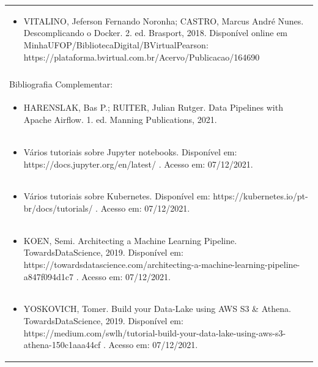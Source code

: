 \documentclass[11pt]{article}
\begin{document}
\begin{center}
\begin{longtable}{|p{4cm}|p{4cm}|p{4cm}|p{4cm}|}
\multicolumn{4}{|p{\dimexpr 16cm + 6\tabcolsep\relax}|}{\begin{itemize}\item VITALINO, Jeferson Fernando Noronha; CASTRO, Marcus André Nunes. Descomplicando o Docker. 2. ed. Brasport, 2018. Disponível online em MinhaUFOP/BibliotecaDigital/BVirtualPearson: https://plataforma.bvirtual.com.br/Acervo/Publicacao/164690\end{itemize}}\\
\multicolumn{4}{|p{16cm}|}{}\\
\hline
\multicolumn{4}{|p{16cm}|}{Bibliografia Complementar:}\\*
\multicolumn{4}{|p{\dimexpr 16cm + 6\tabcolsep\relax}|}{\begin{itemize}\item HARENSLAK, Bas P.; RUITER, Julian Rutger. Data Pipelines with Apache Airflow. 1. ed. Manning Publications, 2021.\end{itemize}}\\
\multicolumn{4}{|p{\dimexpr 16cm + 6\tabcolsep\relax}|}{\begin{itemize}\item Vários tutoriais sobre Jupyter notebooks. Disponível em: https://docs.jupyter.org/en/latest/ . Acesso em: 07/12/2021.\end{itemize}}\\
\multicolumn{4}{|p{\dimexpr 16cm + 6\tabcolsep\relax}|}{\begin{itemize}\item Vários tutoriais sobre Kubernetes. Disponível em: https://kubernetes.io/pt-br/docs/tutorials/ . Acesso em: 07/12/2021.\end{itemize}}\\
\multicolumn{4}{|p{\dimexpr 16cm + 6\tabcolsep\relax}|}{\begin{itemize}\item KOEN, Semi. Architecting a Machine Learning Pipeline. TowardsDataScience, 2019. Disponível em: https://towardsdatascience.com/architecting-a-machine-learning-pipeline-a847f094d1c7 . Acesso em: 07/12/2021.\end{itemize}}\\
\multicolumn{4}{|p{\dimexpr 16cm + 6\tabcolsep\relax}|}{\begin{itemize}\item YOSKOVICH, Tomer. Build your Data-Lake using AWS S3 \& Athena. TowardsDataScience, 2019. Disponível em: https://medium.com/swlh/tutorial-build-your-data-lake-using-aws-s3-athena-150c1aaa44cf . Acesso em: 07/12/2021.\end{itemize}}\\

\end{longtable}
\end{center}
\end{document}
